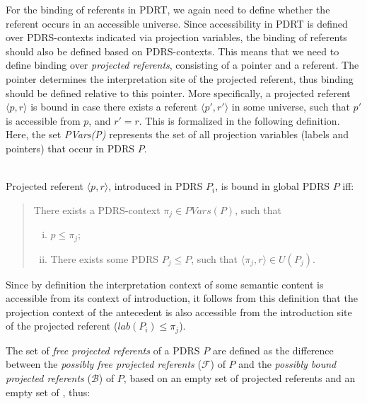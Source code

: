 
For the binding of referents in PDRT, we again need to define whether the
referent occurs in an accessible universe. Since accessibility in PDRT is
defined over PDRS-contexts indicated via projection variables, the binding
of referents should also be defined based on PDRS-contexts. This means that
we need to define binding over \textit{projected referents}, consisting of
a pointer and a referent. The pointer determines the interpretation site of
the projected referent, thus binding should be defined relative to this
pointer.  More specifically, a projected referent $\langle p, r \rangle$ is
bound in case there exists a referent $\langle p',r'\rangle$ in some
universe, such that $p'$ is accessible from $p$, and $r'=r$.
This is formalized in the following definition. Here, the set
\textit{PVars(P)} represents the set of all projection variables (labels and
pointers) that occur in PDRS $P$.

\begin{definition}~\\
Projected referent $\langle p,r\rangle$, introduced in PDRS $P_i$, is bound
in global PDRS $P$ iff:
\begin{quote}
There exists a PDRS-context $\pi_j \in PVars(P)$, such that
\begin{enumerate}[i.]
  \item $p \leq \pi_j$; 
  \item There exists some PDRS $P_j \leq P$, such that 
    $\langle \pi_j,r\rangle \in U(P_j)$.
\end{enumerate}
\end{quote}
\end{definition}

\noindent Since by definition the interpretation context of some semantic content is
accessible from its context of introduction, it follows from this definition
that the projection context of the antecedent is also accessible from the
introduction site of the projected referent ($lab(P_i) \leq \pi_j$). 


The set of \textit{free projected referents} of a PDRS $P$ are defined as the
difference between the \textit{possibly free projected referents} ($\mathcal{F}$) of
$P$ and the \textit{possibly bound projected referents} ($\mathcal{B}$) of $P$, based
on an empty set of projected referents and an empty set of \MAPs, thus:


